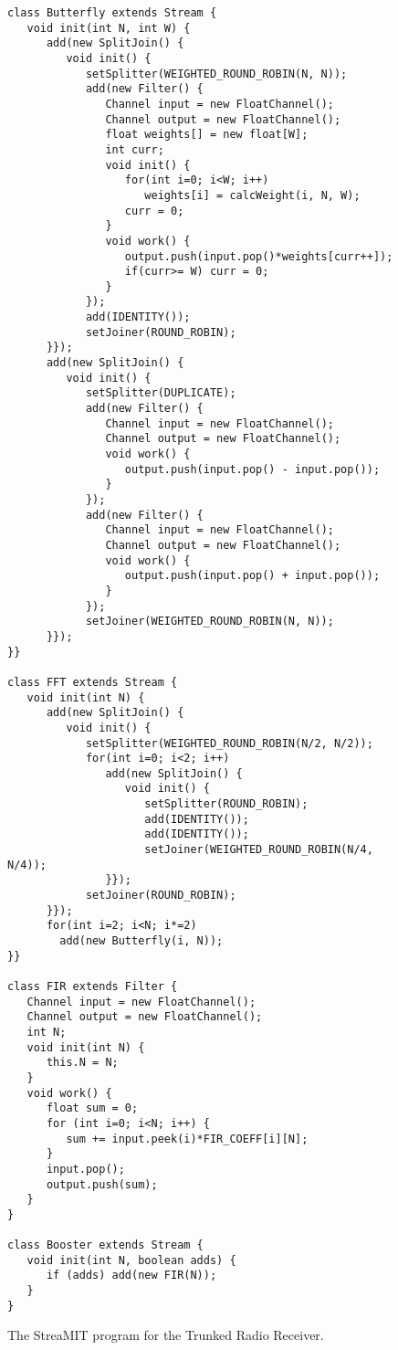 \clearpage

\begin{figure}[h]
\scriptsize
\begin{verbatim}
class Butterfly extends Stream {
   void init(int N, int W) {
      add(new SplitJoin() {
         void init() {
            setSplitter(WEIGHTED_ROUND_ROBIN(N, N));
            add(new Filter() {
               Channel input = new FloatChannel();
               Channel output = new FloatChannel();
               float weights[] = new float[W];
               int curr;
               void init() {
                  for(int i=0; i<W; i++)
                     weights[i] = calcWeight(i, N, W);
                  curr = 0;
               }
               void work() {
                  output.push(input.pop()*weights[curr++]);
                  if(curr>= W) curr = 0;
               }    
            });
            add(IDENTITY());
            setJoiner(ROUND_ROBIN);
      }});
      add(new SplitJoin() {
         void init() {
            setSplitter(DUPLICATE);
            add(new Filter() {   
               Channel input = new FloatChannel();
               Channel output = new FloatChannel();
               void work() {
                  output.push(input.pop() - input.pop());
               }
            });
            add(new Filter() {   
               Channel input = new FloatChannel();
               Channel output = new FloatChannel();
               void work() {
                  output.push(input.pop() + input.pop());
               }
            });
            setJoiner(WEIGHTED_ROUND_ROBIN(N, N));
      }});
}}

class FFT extends Stream {
   void init(int N) {
      add(new SplitJoin() {
         void init() {
            setSplitter(WEIGHTED_ROUND_ROBIN(N/2, N/2));
            for(int i=0; i<2; i++) 
               add(new SplitJoin() {
                  void init() {
                     setSplitter(ROUND_ROBIN);
                     add(IDENTITY());
                     add(IDENTITY());
                     setJoiner(WEIGHTED_ROUND_ROBIN(N/4, N/4));
               }});
            setJoiner(ROUND_ROBIN);
      }});
      for(int i=2; i<N; i*=2)
        add(new Butterfly(i, N));
}}

class FIR extends Filter {
   Channel input = new FloatChannel();
   Channel output = new FloatChannel();           
   int N;
   void init(int N) {
      this.N = N;
   }
   void work() {
      float sum = 0;
      for (int i=0; i<N; i++) {
         sum += input.peek(i)*FIR_COEFF[i][N];
      }
      input.pop();
      output.push(sum);
   }
}

class Booster extends Stream {
   void init(int N, boolean adds) {
      if (adds) add(new FIR(N));
   }
}
\end{verbatim}
\vspace{-12pt}
\caption{\protect\small The StreaMIT program for the Trunked Radio Receiver.
\protect\label{fig:radiocode}}
\vspace{-12pt}
\end{figure}


